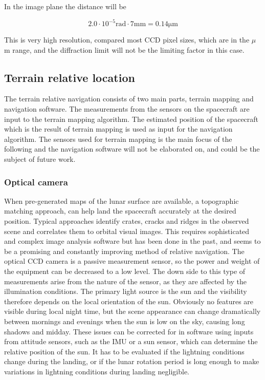 In the image plane the distance will be

\begin{equation}
2.0 \cdot 10 ^{-5} \mathrm{rad} \cdot 7 \mathrm{mm} = 0.14 \mathrm{\mu m} 
\end{equation}

This is very high resolution, compared most CCD pixel sizes, which are in the $\mu$ m range, and the diffraction limit will not be the limiting factor in this case. 


\subsection{Terrain relative location}


The terrain relative navigation consists of two main parts, terrain mapping and navigation software.
The measurements from the sensors on the spacecraft are input to the terrain mapping algorithm. The estimated position of the spacecraft which is the result of terrain mapping is used as input for the navigation algorithm. The sensors used for terrain mapping is the main focus of the following and the navigation software will not be elaborated on, and could be the subject of future work. 


\subsubsection{Optical camera}

When pre-generated maps of the lunar surface are available, a topographic matching approach, can help land the spacecraft accurately at the desired position. Typical approaches identify crates, cracks and ridges in the observed scene and correlates them to orbital visual images. This requires sophisticated and complex image analysis software but has been done in the past, and seems to be a promising and constantly improving method of relative navigation. The optical CCD camera is a passive measurement sensor, so the power and weight of the equipment can be decreased to a low level. The down side to this type of measurements arise from the nature of the sensor, as they are affected by the illumination conditions. The primary light source is the sun and the visibility therefore depends on the local orientation of the sun. Obviously no features are visible during local night time, but the scene appearance can change dramatically between mornings and evenings when the sun is low on the sky, causing long shadows and midday. These issues can be corrected for in software using inputs from attitude sensors, such as the IMU or a sun sensor, which can determine the relative position of the sun. It has to be evaluated if the lightning conditions change during the landing, or if the lunar rotation period is long enough to make variations in lightning conditions during landing negligible. 


